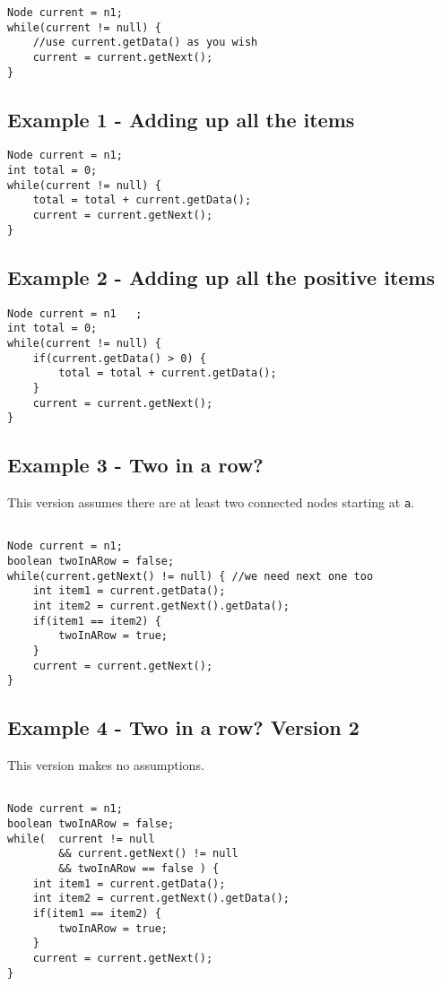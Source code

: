 \documentclass{exam}
\begin{document}
\begin{lstlisting}
Node current = n1;
while(current != null) {
	//use current.getData() as you wish
	current = current.getNext();
}
\end{lstlisting}

\subsection*{Example 1 - Adding up all the items}

\begin{lstlisting}
Node current = n1;
int total = 0;
while(current != null) {
	total = total + current.getData();
	current = current.getNext();
}
\end{lstlisting}

\subsection*{Example 2 - Adding up all the positive items}

\begin{lstlisting}
Node current = n1	;
int total = 0;
while(current != null) {
	if(current.getData() > 0) {
		total = total + current.getData();
	}
	current = current.getNext();
}
\end{lstlisting}

\subsection*{Example 3 - Two in a row?}

This version assumes there are at least two connected nodes starting at \texttt{a}.
\begin{lstlisting}

Node current = n1;
boolean twoInARow = false;
while(current.getNext() != null) { //we need next one too
	int item1 = current.getData();
	int item2 = current.getNext().getData();
	if(item1 == item2) {
		twoInARow = true;
	}
	current = current.getNext();
}
\end{lstlisting}

\subsection*{Example 4 - Two in a row? Version 2}

This version makes no assumptions.
\begin{lstlisting}

Node current = n1;
boolean twoInARow = false;
while( 	current != null 
		&& current.getNext() != null
		&& twoInARow == false ) {
	int item1 = current.getData();
	int item2 = current.getNext().getData();
	if(item1 == item2) {
		twoInARow = true;
	}
	current = current.getNext();
}
\end{lstlisting}
\end{document}
